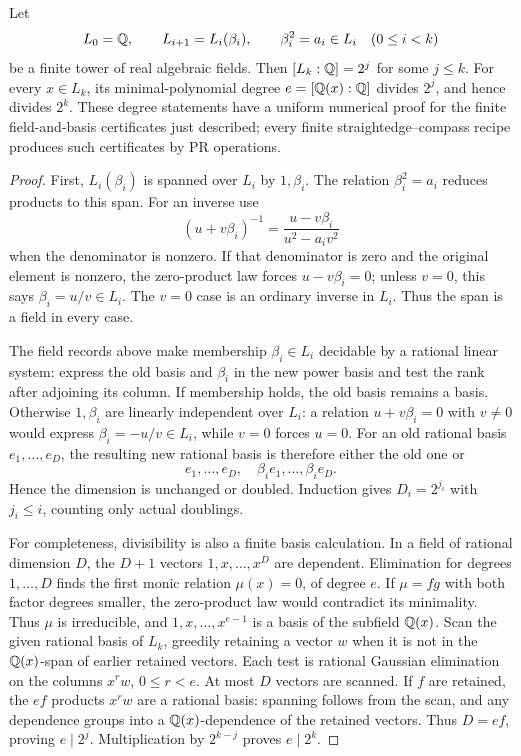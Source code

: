 \begin{theorem}
\label{obs:degree}
Let
\[
 L_0=\mathbb Q,\qquad L_{i+1}=L_i(\beta_i),\qquad
 \beta_i^2=a_i\in L_i\quad(0\le i<k)
\]
be a finite tower of real algebraic fields.  Then
$[L_k:\mathbb Q]=2^j$ for some $j\le k$.  For every $x\in L_k$, its
minimal-polynomial degree $e=[\mathbb Q(x):\mathbb Q]$ divides $2^j$, and hence
divides $2^k$.  These degree statements have a uniform numerical proof
for the finite field-and-basis certificates just described; every finite
straightedge--compass recipe produces such certificates by PR operations.
\end{theorem}
\begin{proof}
First, $L_i(\beta_i)$ is spanned over $L_i$ by $1,\beta_i$.
The relation $\beta_i^2=a_i$ reduces products to this span.  For an
inverse use
\[
 (u+v\beta_i)^{-1}=\frac{u-v\beta_i}{u^2-a_iv^2}
\]
when the denominator is nonzero.  If that denominator is zero and the
original element is nonzero, the zero-product law forces $u-v\beta_i=0$;
unless $v=0$, this says $\beta_i=u/v\in L_i$.  The $v=0$ case is
an ordinary inverse in $L_i$.  Thus the span is a field in every case.

The field records above make membership $\beta_i\in L_i$ decidable by
a rational linear system: express the old basis and $\beta_i$ in the
new power basis and test the rank after adjoining its column.  If
membership holds, the old basis remains a basis.  Otherwise $1,\beta_i$
are linearly independent over $L_i$: a relation $u+v\beta_i=0$ with
$v\ne0$ would express $\beta_i=-u/v\in L_i$, while $v=0$ forces $u=0$.
For an old rational basis $e_1,\ldots,e_D$, the resulting new rational
basis is therefore either the old one or
\[
 e_1,\ldots,e_D,\quad \beta_i e_1,\ldots,\beta_i e_D.
\]
Hence the dimension is unchanged or doubled.  Induction gives
$D_i=2^{j_i}$ with $j_i\le i$, counting only actual doublings.

For completeness, divisibility is also a finite basis calculation.
In a field of rational dimension $D$, the $D+1$ vectors
$1,x,\ldots,x^D$ are dependent.  Elimination for degrees $1,\ldots,D$
finds the first monic relation $\mu(x)=0$, of degree $e$.
If $\mu=fg$ with both factor degrees smaller, the zero-product law
would contradict its minimality.  Thus $\mu$ is irreducible, and
$1,x,\ldots,x^{e-1}$ is a basis of the subfield $\mathbb Q(x)$.
Scan the given rational basis of $L_k$, greedily retaining a vector $w$
when it is not in the $\mathbb Q(x)$-span of earlier retained vectors.
Each test is rational Gaussian elimination on the columns $x^r w$,
$0\le r<e$.  At most $D$ vectors are scanned.  If $f$ are retained,
the $ef$ products $x^r w$ are a rational basis: spanning follows from
the scan, and any dependence groups into a $\mathbb Q(x)$-dependence of the
retained vectors.  Thus $D=ef$, proving $e\mid2^j$.
Multiplication by $2^{k-j}$ proves $e\mid2^k$.


\end{proof}
